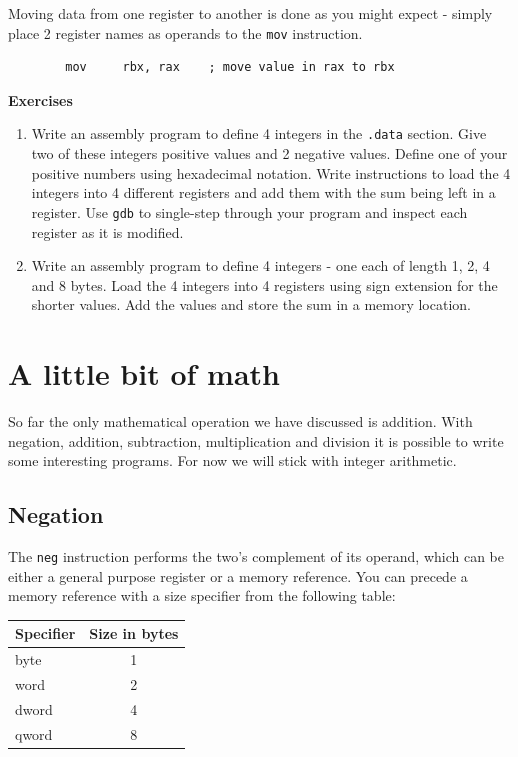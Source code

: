 \documentclass[11pt,b5paper]{book}
\begin{document}
Moving data from one register to another is done as you might expect - simply 
place 2 register names as operands to the {\tt mov} instruction.
\begin{verbatim}
        mov     rbx, rax    ; move value in rax to rbx
\end{verbatim}

\vfill
\break
{\bf\large Exercises}

\begin{enumerate}
\item Write an assembly program to define 4 integers in the {\tt .data}
section.  Give two of these integers positive values and 2 negative values.
Define one of your positive numbers using hexadecimal notation.
Write instructions to load the 4 integers into 4 different registers and add
them with the sum being left in a register.
Use {\tt gdb} to single-step through your program and inspect each register as
it is modified.
\item Write an assembly program to define 4 integers - one each of length 1, 2, 4 and
8 bytes.
Load the 4 integers into 4 registers using sign extension for the shorter values.
Add the values and store the sum in a memory location.
\end{enumerate}

\chapter{A little bit of math}

So far the only mathematical operation we have discussed is addition.
With negation, addition, subtraction, multiplication and division it
is possible to write some interesting programs.
For now we will stick with integer arithmetic.

\section{Negation}

The {\tt neg} instruction performs the two's complement of its operand, which 
can be either a general purpose register or a memory reference.
You can precede a memory reference with a size specifier from the following
table:
\begin{center}
\begin{tabular}{|l|c|}
\hline
Specifier & Size in bytes \\
\hline
byte      & 1 \\
\hline
word      & 2 \\
\hline
dword      & 4 \\
\hline
qword      & 8 \\
\hline
\end{tabular}
\end{center}
\end{document}
